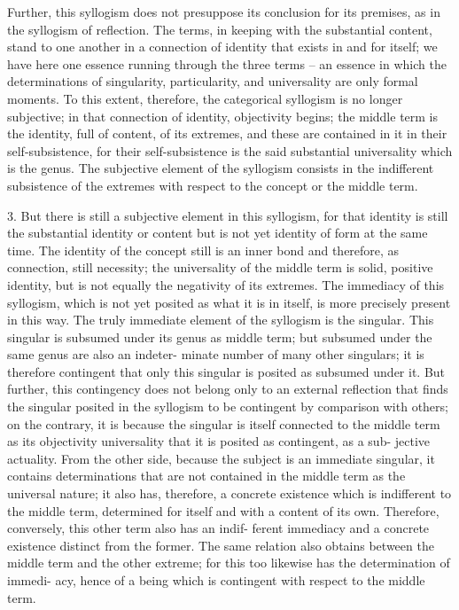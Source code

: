 Further, this syllogism does not presuppose its conclusion for its
premises, as in the syllogism of reflection.
 The terms, in keeping with
the substantial content, stand to one another in a connection of identity
that exists in and for itself; we have here one essence running through
the three terms –
 an essence in which the determinations of singularity,
particularity, and universality are only formal moments.
To this extent, therefore, the categorical syllogism is no longer subjective;
in that connection of identity, objectivity begins;
the middle term is the
identity, full of content, of its extremes,
 and these are contained in it in their
self-subsistence, for their self-subsistence is the said substantial universality
which is the genus.
 The subjective element of the syllogism consists in the
indifferent subsistence of the extremes with respect to the concept or the
middle term.

3. But there is still a subjective element in this syllogism, for that identity
is still the substantial identity or content but is not yet identity of form at the
same time. The identity of the concept still is an inner bond and therefore,
as connection, still necessity;
the universality of the middle term is solid,
positive identity, but is not equally the negativity of its extremes.
The immediacy of this syllogism, which is not yet posited as what it is in
itself, is more precisely present in this way.
The truly immediate element
of the syllogism is the singular.
This singular is subsumed under its genus
as middle term; but subsumed under the same genus are also an indeter-
minate number of many other singulars;
it is therefore contingent that only
this singular is posited as subsumed under it.
But further, this contingency does not belong
only to an external reflection that finds the singular
posited in the syllogism to be contingent by comparison with others;
on the contrary, it is because the singular is itself connected to the middle
term as its objectivity universality that it is posited as contingent, as a sub-
jective actuality.
From the other side, because the subject is an immediate
singular, it contains determinations that are not contained in the middle
term as the universal nature; it also has, therefore, a concrete existence
which is indifferent to the middle term, determined for itself and with a
content of its own.
Therefore, conversely, this other term also has an indif-
ferent immediacy and a concrete existence distinct from the former.
The same relation also obtains between the middle term and the
other extreme;
for this too likewise has the determination of immedi-
acy, hence of a being which is contingent with respect to the middle
term.

